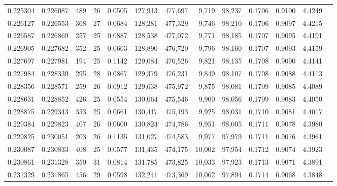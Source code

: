 \begin{tabular}{rrrrrrrrrrrrr}
0.225304 & 0.226087 &    489 &    26 &                                     0.0505 & 127,913 & 477,697 &   9,719 &  98,237 & 0.1706 & 0.9100 & 4.4249 \\
0.226127 & 0.226553 &    368 &    27 &                                     0.0684 & 128,281 & 477,329 &   9,746 &  98,210 & 0.1706 & 0.9097 & 4.4215 \\
0.226587 & 0.226869 &    257 &    25 &                                     0.0887 & 128,538 & 477,072 &   9,771 &  98,185 & 0.1707 & 0.9095 & 4.4191 \\
0.226905 & 0.227682 &    352 &    25 &                                     0.0663 & 128,890 & 476,720 &   9,796 &  98,160 & 0.1707 & 0.9093 & 4.4159 \\
0.227697 & 0.227981 &    194 &    25 &                                     0.1142 & 129,084 & 476,526 &   9,821 &  98,135 & 0.1708 & 0.9090 & 4.4141 \\
0.227984 & 0.228339 &    295 &    28 &                                     0.0867 & 129,379 & 476,231 &   9,849 &  98,107 & 0.1708 & 0.9088 & 4.4113 \\
0.228356 & 0.228571 &    259 &    26 &                                     0.0912 & 129,638 & 475,972 &   9,875 &  98,081 & 0.1709 & 0.9085 & 4.4089 \\
0.228631 & 0.228852 &    426 &    25 &                                     0.0554 & 130,064 & 475,546 &   9,900 &  98,056 & 0.1709 & 0.9083 & 4.4050 \\
0.228875 & 0.229343 &    353 &    25 &                                     0.0661 & 130,417 & 475,193 &   9,925 &  98,031 & 0.1710 & 0.9081 & 4.4017 \\
0.229384 & 0.229823 &    407 &    26 &                                     0.0600 & 130,824 & 474,786 &   9,951 &  98,005 & 0.1711 & 0.9078 & 4.3980 \\
0.229825 & 0.230051 &    203 &    26 &                                     0.1135 & 131,027 & 474,583 &   9,977 &  97,979 & 0.1711 & 0.9076 & 4.3961 \\
0.230087 & 0.230833 &    408 &    25 &                                     0.0577 & 131,435 & 474,175 &  10,002 &  97,954 & 0.1712 & 0.9074 & 4.3923 \\
0.230861 & 0.231328 &    350 &    31 &                                     0.0814 & 131,785 & 473,825 &  10,033 &  97,923 & 0.1713 & 0.9071 & 4.3891 \\
0.231329 & 0.231865 &    456 &    29 &                                     0.0598 & 132,241 & 473,369 &  10,062 &  97,894 & 0.1714 & 0.9068 & 4.3848 \\

\end{tabular}
